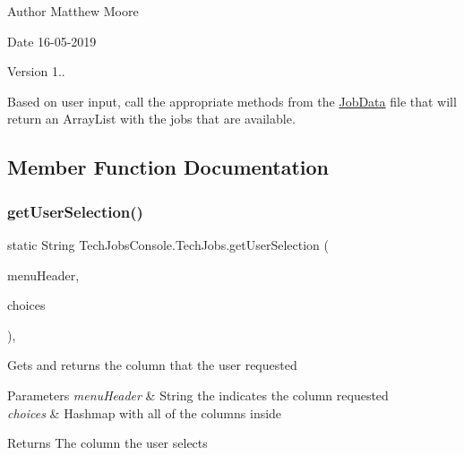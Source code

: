 \begin{DoxyAuthor}{Author}
Matthew Moore 
\end{DoxyAuthor}
\begin{DoxyDate}{Date}
16-\/05-\/2019 
\end{DoxyDate}
\begin{DoxyVersion}{Version}
1..
\end{DoxyVersion}
Based on user input, call the appropriate methods from the \mbox{\hyperlink{class_tech_jobs_console_1_1_job_data}{Job\+Data}} file that will return an Array\+List with the jobs that are available. 

\subsection{Member Function Documentation}
\mbox{\label{class_tech_jobs_console_1_1_tech_jobs_aea72d04cffd1467dd68ce9bfee22cd64}} 
\subsubsection{\texorpdfstring{getUserSelection()}{getUserSelection()}}
{\footnotesize\ttfamily static String Tech\+Jobs\+Console.\+Tech\+Jobs.\+get\+User\+Selection (\begin{DoxyParamCaption}\item[{String}]{menu\+Header,  }\item[{Hash\+Map$<$ String, String $>$}]{choices }\end{DoxyParamCaption})\hspace{0.3cm}{\ttfamily [static]}, {\ttfamily [private]}}

Gets and returns the column that the user requested 
\begin{DoxyParams}{Parameters}
{\em menu\+Header} & String the indicates the column requested \\
\hline
{\em choices} & Hashmap with all of the columns inside \\
\hline
\end{DoxyParams}
\begin{DoxyReturn}{Returns}
The column the user selects 
\end{DoxyReturn}
\mbox{\label{class_tech_jobs_console_1_1_tech_jobs_aca7466b1cc8ef93c94b62a62c656bfca}} 
